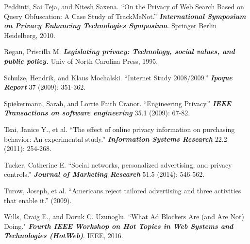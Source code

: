 \documentclass[conference]{IEEEtran}
\begin{document}
\begin{thebibliography}{99}
 Peddinti, Sai Teja, and Nitesh Saxena. “On the Privacy of Web Search Based on Query
Obfuscation: A Case Study of TrackMeNot.” \textbf{\textit{International Symposium on Privacy Enhancing Technologies Symposium}}. Springer Berlin Heidelberg, 2010.

 Regan, Priscilla M. \textbf{\textit{Legislating privacy: Technology, social values, and public policy.}} Univ of North Carolina Press, 1995.

 Schulze, Hendrik, and Klaus Mochalski. “Internet Study 2008/2009.” \textbf{\textit{Ipoque Report}} 37 (2009): 351-362.

 Spiekermann, Sarah, and Lorrie Faith Cranor. “Engineering Privacy.” \textbf{\textit{IEEE Transactions on software engineering}} 35.1 (2009): 67-82.

 Tsai, Janice Y., et al. “The effect of online privacy information on purchasing behavior: An experimental study.” \textbf{\textit{Information Systems Research}} 22.2 (2011): 254-268.

 Tucker, Catherine E. “Social networks, personalized advertising, and privacy controls.” \textbf{\textit{Journal of Marketing Research}} 51.5 (2014): 546-562.

 Turow, Joseph, et al. “Americans reject tailored advertising and three activities that enable it.” (2009).

 Wills, Craig E., and Doruk C. Uzunoglu. “What Ad Blockers Are (and Are Not) Doing." \textbf{\textit{Fourth IEEE Workshop on Hot Topics in Web Systems and Technologies (HotWeb)}}. IEEE, 2016.


\end{thebibliography}
\end{document}
